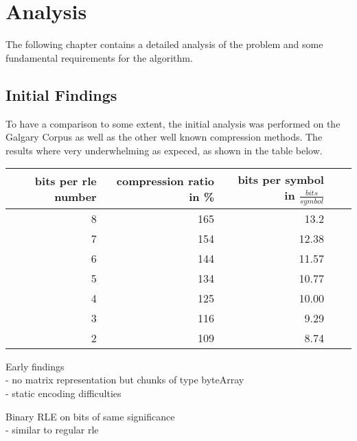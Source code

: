 
\chapter{Analysis}
\label{ch:Analysis}

\par{
The following chapter contains a detailed analysis of the problem and some fundamental requirements for the algorithm. 
}

\section{Initial Findings}
\label{ch:Analysis:sec:Initial Findings}

\par{
To have a comparison to some extent, the initial analysis was performed on the Galgary Corpus as well as the other well known compression methods. The results where very underwhelming as expeced, as shown in the table below.
}

\begin{center}
	\begin{tabular}[p]{r|r|r|r|r}
				\label{tab:t5 run length eval}
		
		bits per rle number & compression ratio in \% & bits per symbol in $\frac{bits}{symbol}$\\
		\hline
		8 & 165 & 13.2 \\
		7 & 154 & 12.38\\
		6 & 144 & 11.57 \\
		5 & 134 & 10.77\\
		4 & 125 & 10.00\\
		3 & 116 & 9.29\\
		2 & 109 & 8.74 \\
	\end{tabular}
\end{center}



\par{
	Early findings\\
- no matrix representation but chunks of type byteArray\\
- static encoding difficulties\\
}

\par{
Binary RLE on bits of same significance\\
- similar to regular rle\\ 
}

